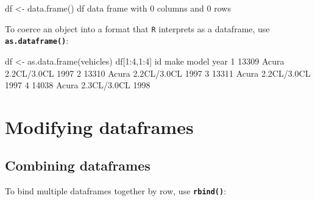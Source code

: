 \documentclass[
]{book}
\newenvironment{Shaded}{\begin{snugshade}}{\end{snugshade}}
\newcommand{\DecValTok}[1]{\textcolor[rgb]{0.00,0.00,0.81}{#1}}
\newcommand{\FloatTok}[1]{\textcolor[rgb]{0.00,0.00,0.81}{#1}}
\newcommand{\FunctionTok}[1]{\textcolor[rgb]{0.00,0.00,0.00}{#1}}
\newcommand{\NormalTok}[1]{#1}
\newcommand{\OtherTok}[1]{\textcolor[rgb]{0.56,0.35,0.01}{#1}}
\newcommand{\SpecialCharTok}[1]{\textcolor[rgb]{0.00,0.00,0.00}{#1}}
\begin{document}
\begin{Shaded}
\begin{Highlighting}[]
\NormalTok{df }\OtherTok{\textless{}{-}} \FunctionTok{data.frame}\NormalTok{()}
\NormalTok{df}
\NormalTok{data frame with }\DecValTok{0}\NormalTok{ columns and }\DecValTok{0}\NormalTok{ rows}
\end{Highlighting}
\end{Shaded}

To coerce an object into a format that \texttt{R} interprets as a dataframe, use \textbf{\texttt{as.dataframe()}}:

\begin{Shaded}
\begin{Highlighting}[]
\NormalTok{df }\OtherTok{\textless{}{-}} \FunctionTok{as.data.frame}\NormalTok{(vehicles)}
\NormalTok{df[}\DecValTok{1}\SpecialCharTok{:}\DecValTok{4}\NormalTok{,}\DecValTok{1}\SpecialCharTok{:}\DecValTok{4}\NormalTok{]}
\NormalTok{     id  make       model year}
\DecValTok{1} \DecValTok{13309}\NormalTok{ Acura }\FloatTok{2.2}\NormalTok{CL}\SpecialCharTok{/}\FloatTok{3.0}\NormalTok{CL }\DecValTok{1997}
\DecValTok{2} \DecValTok{13310}\NormalTok{ Acura }\FloatTok{2.2}\NormalTok{CL}\SpecialCharTok{/}\FloatTok{3.0}\NormalTok{CL }\DecValTok{1997}
\DecValTok{3} \DecValTok{13311}\NormalTok{ Acura }\FloatTok{2.2}\NormalTok{CL}\SpecialCharTok{/}\FloatTok{3.0}\NormalTok{CL }\DecValTok{1997}
\DecValTok{4} \DecValTok{14038}\NormalTok{ Acura }\FloatTok{2.3}\NormalTok{CL}\SpecialCharTok{/}\FloatTok{3.0}\NormalTok{CL }\DecValTok{1998}
\end{Highlighting}
\end{Shaded}

\hypertarget{modifying-dataframes}{%
\section*{Modifying dataframes}\label{modifying-dataframes}}

\hypertarget{combining-dataframes}{%
\subsection*{Combining dataframes}\label{combining-dataframes}}

To bind multiple dataframes together by row, use \textbf{\texttt{rbind()}}:
\end{document}
